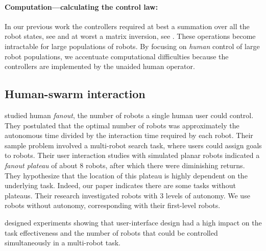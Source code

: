 \paragraph{Computation---calculating the control law:}
In our previous work the controllers required at best a summation over all the robot states, see \cite{Becker2012k} and at worst a matrix inversion, see \cite{Becker2012}. 
These operations become intractable for large populations of robots. By focusing on \emph{human} control of large robot populations, we accentuate computational difficulties because the controllers are implemented by the unaided human operator. %


 \subsection{Human-swarm interaction}
\cite{Jr2004} studied human \emph{fanout}, the number of robots a single human user could control.  %
They postulated that the optimal number of robots was approximately  the autonomous time  divided by the interaction time required by each robot.  Their sample problem involved a multi-robot search task, where users could assign goals to robots.  Their user interaction studies with simulated planar robots  indicated a \emph{fanout plateau} of about 8 robots, after which there were diminishing returns.   They hypothesize that the location of this plateau is highly dependent on the underlying task.  Indeed, our paper indicates there are some tasks without plateaus. %
Their research investigated robots with 3 levels of autonomy.  We use robots without autonomy, corresponding with their first-level robots.


\cite{Squire:2006:HCM:1121241.1121248} designed experiments showing that user-interface design had a high impact on the task effectiveness and the number of robots that could be controlled simultaneously in a multi-robot task.

